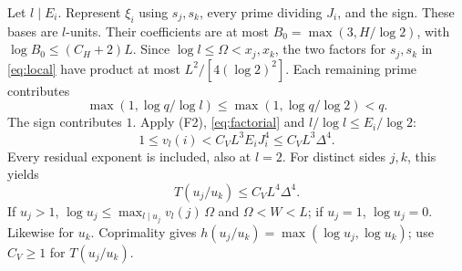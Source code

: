\documentclass{amsart}
\theoremstyle{remark}
\numberwithin{equation}{section}
\begin{document}
Let $l\mid E_i$.
Represent $\xi_i$ using $s_j,s_k$, every prime dividing $J_i$, and the sign.
These bases are $l$-units.
Their coefficients are at most $B_0=\max(3,H/\log2)$, with
$\log B_0\le(C_H+2)L$.
Since $\log l\le\Omega<x_j,x_k$, the two factors for $s_j,s_k$ in
\eqref{eq:local} have product at most $L^2/[4(\log2)^2]$.
Each remaining prime contributes
\[
\max(1,\log q/\log l)\le\max(1,\log q/\log2)<q.
\]
The sign contributes $1$.
Apply (F2), \eqref{eq:factorial} and $l/\log l\le E_i/\log2$:
\begin{equation}\label{eq:residual}
1\le v_l(i)<C_VL^3E_iJ_i^4\le C_VL^3\Delta^4.
\end{equation}
Every residual exponent is included, also at $l=2$.
For distinct sides $j,k$, this yields
\begin{equation}\label{eq:cofactor}
T(u_j/u_k)\le C_VL^4\Delta^4.
\end{equation}
If $u_j>1$,
$\log u_j\le\max_{l\mid u_j}v_l(j)\,\Omega$ and $\Omega<W<L$;
if $u_j=1$, $\log u_j=0$.
Likewise for $u_k$. Coprimality gives
$h(u_j/u_k)=\max(\log u_j,\log u_k)$; use $C_V\ge1$ for $T(u_j/u_k)$.
\end{document}
